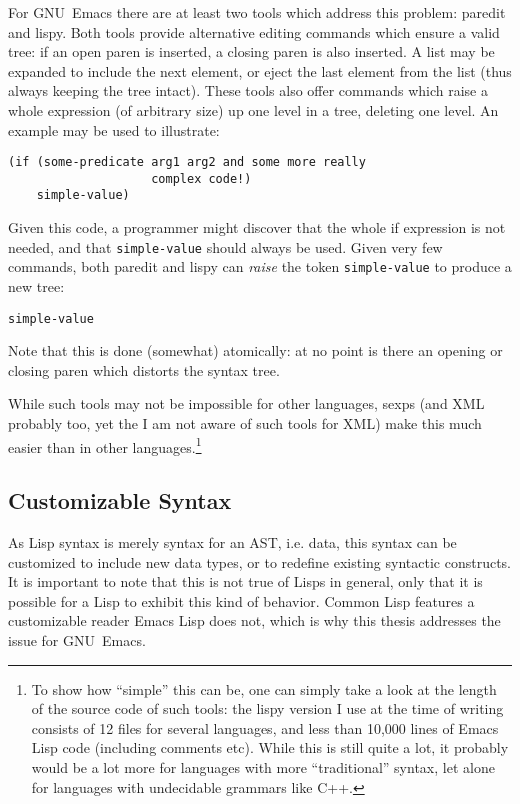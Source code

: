 \documentclass[a4paper,10pt,twoside]{report}
\newcommand{\el}{Emacs Lisp}
\newcommand{\cl}{Common Lisp}
\newcommand{\sym}[1]{\texttt{#1}}
\newcommand{\emacs}{GNU~Emacs}
\begin{document}
For \emacs{} there are at least two tools which address this problem:
paredit\cite{paredit} and lispy\cite{lispy}.  Both tools provide alternative
editing commands which ensure a valid tree:  if an open paren is inserted, a
closing paren is also inserted.  A list may be expanded to include the next
element, or eject the last element from the list (thus always keeping the tree
intact).  These tools also offer commands which raise a whole expression (of
arbitrary size) up one level in a tree, deleting one level.  An example may be
used to illustrate:

\begin{lstlisting}[style=lispinline]
(if (some-predicate arg1 arg2 and some more really
                    complex code!)
    simple-value)
\end{lstlisting}

Given this code, a programmer might discover that the whole if expression is not
needed, and that \sym{simple-value} should always be used.  Given very few
commands, both paredit and lispy can \emph{raise} the token \sym{simple-value}
to produce a new tree:

\begin{lstlisting}[style=lispinline]
simple-value
\end{lstlisting}

Note that this is done (somewhat) atomically: at no point is there an opening or
closing paren which distorts the syntax tree.

While such tools may not be impossible for other languages, sexps (and XML
probably too, yet the I am not aware of such tools for XML) make this much
easier than in other languages.\footnote{To show how ``simple'' this can be, one
  can simply take a look at the length of the source code of such tools: the
  lispy version I use at the time of writing consists of 12 files for several
  languages, and less than 10,000 lines of \el{} code (including comments etc).
  While this is still quite a lot, it probably would be a lot more for languages
  with more ``traditional'' syntax, let alone for languages with undecidable
  grammars like C++.}

\pagebreak

\subsection{Customizable Syntax}
\label{subsec:custom-syntax}

As Lisp syntax is merely syntax for an AST, i.e. data, this syntax can be
customized to include new data types, or to redefine existing syntactic
constructs.  It is important to note that this is not true of Lisps in general,
only that it is possible for a Lisp to exhibit this kind of behavior.  \cl{}
features a customizable reader \el{} does not, which is why this thesis
addresses the issue for \emacs{}.
\end{document}
